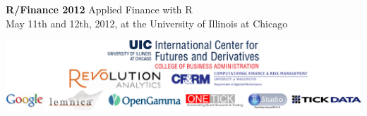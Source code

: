 {\Huge \textbf{\color{KeynoteTalk} R/Finance 2012} \huge \phantom{i} Applied Finance with R} \\
{\large \color{Breaks} May 11th and 12th, 2012, at the University of Illinois at Chicago} \\
\vspace{3ex}
\hrulefill
\vspace{-2ex}
\begin{center}
\includegraphics[scale=0.8]{sponsors_2012.pdf}
\end{center}
\vspace{-3ex}
\hrulefill


